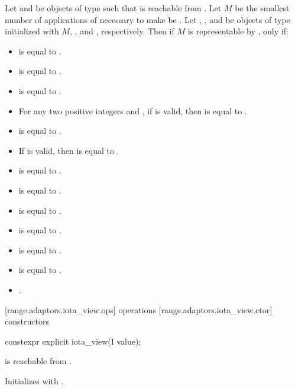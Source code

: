 Let  and  be objects of type  such that  is
reachable from . Let $M$ be the smallest number of applications
of  necessary to make  be . Let
, , and  be objects of type
initialized with $M$, , and , respectively. Then if
$M$ is representable by ,
 only if:
\begin{itemize}
\item {} is equal to .
\item {} is equal to .
\item {} is equal to .
\item For any two positive integers  and , if
 is valid, then  is equal to
.
\item {} is equal to .
\item If  is valid, then  is equal to
.
\item {} is equal to .
\item {} is equal to .
\item {} is equal to .
\item {} is equal to .
\item {} is equal to .
\item {} is equal to .
\item {}.
\end{itemize}

[range.adaptors.iota_view.ops]{ operations}
[range.adaptors.iota_view.ctor]{ constructors}

%
\begin{itemdecl}
constexpr explicit iota_view(I value);
\end{itemdecl}

\begin{itemdescr}
\pnum
\requires {} is reachable from .

\pnum
\effects Initializes  with .
\end{itemdescr}

